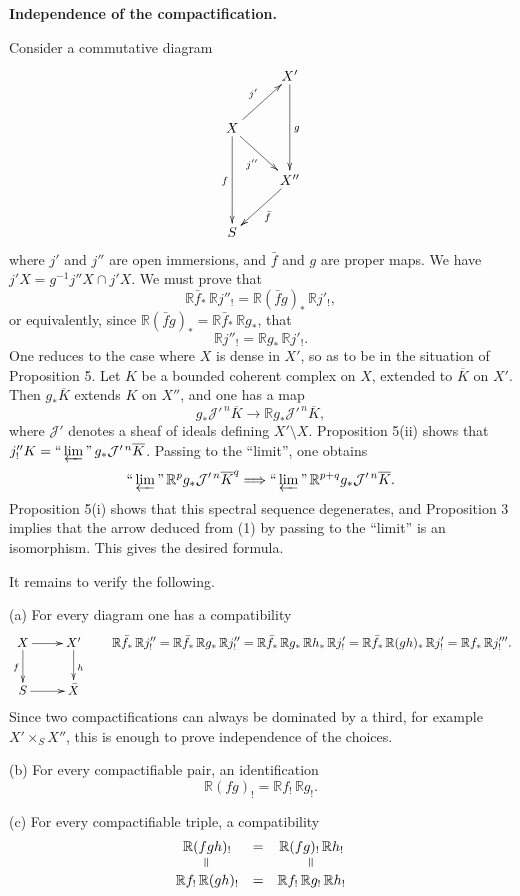 \documentclass[12pt]{amsart}
\theoremstyle{plain}
\theoremstyle{definition}
\newcommand{\cJ}{\mathcal{J}}
\newcommand{\bR}{\mathbb{R}}
\begin{document}
\medskip

\textbf{Independence of the compactification.}

Consider a commutative diagram
\[
\xymatrix{
& X' \ar[dd]^g \\
X \ar[ur]^{j'} \ar[dr]_{j''} \ar[dd]_f & \\
& X'' \ar[dl]^{\bar f} \\
S &
}
\]
where $j'$ and $j''$ are open immersions, and $\bar f$ and $g$ are proper maps. We have $j'X=g^{-1}j''X\cap j'X$. We must prove that
\[
\bR\bar f_*\,\bR j''_!=\bR(\bar f g)_*\,\bR j'_!,
\]
or equivalently, since $\bR(\bar f g)_*=\bR\bar f_*\,\bR g_*$, that
\[
\bR j''_!=\bR g_*\,\bR j'_!.
\]
One reduces to the case where $X$ is dense in $X'$, so as to be in the situation of Proposition 5. Let $K$ be a bounded coherent complex on $X$, extended to $\overline K$ on $X'$. Then $g_*\overline K$ extends $K$ on $X''$, and one has a map
\begin{equation}
g_*\cJ'^{\,n}\overline K\to\bR g_*\cJ'^{\,n}\overline K,
\end{equation}
where $\cJ'$ denotes a sheaf of ideals defining $X'\setminus X$. Proposition 5(ii) shows that $j''_!K=\text{``}\varprojlim\text{''}\,g_*\cJ'^{\,n}\overline K$. Passing to the ``limit'', one obtains
\[
\text{``}\varprojlim\text{''}\,\bR^pg_*\cJ'^{\,n}\overline K^q\Longrightarrow\text{``}\varprojlim\text{''}\,\bR^{p+q}g_*\cJ'^{\,n}\overline K.
\]
Proposition 5(i) shows that this spectral sequence degenerates, and Proposition 3 implies that the arrow deduced from (1) by passing to the ``limit'' is an isomorphism. This gives the desired formula.

It remains to verify the following.

(a) For every diagram one has a compatibility
\[
\xymatrix{
X \ar[r] \ar[d]_f & X' \ar[d]^h \\
S \ar[r] & \bar X
}
\qquad
\bR\bar f_*\,\bR j''_!=\bR\bar f_*\,\bR g_*\,\bR j''_!=\bR\bar f_*\,\bR g_*\,\bR h_*\,\bR j'_!=\bR\bar f_*\,\bR(gh)_*\,\bR j'_!=\bR f_*\,\bR j'''_!.
\]
Since two compactifications can always be dominated by a third, for example $X'\times_S X''$, this is enough to prove independence of the choices.

(b) For every compactifiable pair, an identification
\[
\bR(fg)_!=\bR f_!\,\bR g_!.
\]

(c) For every compactifiable triple, a compatibility
\[
\begin{array}{ccc}
\bR(fgh)_!&=&\bR(fg)_!\,\bR h_!\\
\rotatebox{90}{$=$}&&\rotatebox{90}{$=$}\\
\bR f_!\,\bR(gh)_!&=&\bR f_!\,\bR g_!\,\bR h_!
\end{array}
\]
\end{document}
